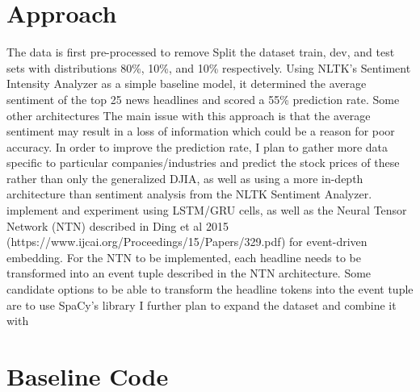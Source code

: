 \documentclass{article} %
\begin{document}
\section{Approach}
The data is first pre-processed to remove 
Split the dataset train, dev, and test sets with distributions 80\%, 10\%, and 10\% respectively.
Using NLTK's Sentiment Intensity Analyzer as a simple baseline model, it determined the average sentiment of the top 25 news headlines and scored a 55\% prediction rate. 
Some other architectures 
The main issue with this approach is that the average sentiment may result in a loss of information which could be a reason for poor accuracy.
In order to improve the prediction rate, I plan to gather more data specific to particular companies/industries and predict the stock prices of these rather than only the generalized DJIA, as well as using a more in-depth architecture than sentiment analysis from the NLTK Sentiment Analyzer.
implement and experiment using LSTM/GRU cells, as well as the Neural Tensor Network (NTN) described in Ding et al 2015 (https://www.ijcai.org/Proceedings/15/Papers/329.pdf) for event-driven embedding.
For the NTN to be implemented, each headline needs to be transformed into an event tuple described in the NTN architecture.
Some candidate options to be able to transform the headline tokens into the event tuple are to use SpaCy's library
I further plan to expand the dataset and combine it with 

\section{Baseline Code}
\end{document}
